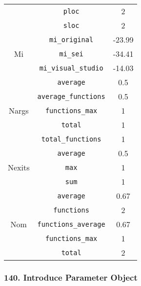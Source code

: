 \begin{center}
\begin{tabular}{ |c|c|c| }
          & \verb|ploc|                           & 2          \\
          & \verb|sloc|                           & 2          \\
    \hline
    \multirow{ 3 }{6em}{ Mi }
          & \verb|mi_original|                    & -23.99     \\
          & \verb|mi_sei|                         & -34.41     \\
          & \verb|mi_visual_studio|               & -14.03     \\
    \hline
    \multirow{ 5 }{6em}{ Nargs }
          & \verb|average|                        & 0.5        \\
          & \verb|average_functions|              & 0.5        \\
          & \verb|functions_max|                  & 1          \\
          & \verb|total|                          & 1          \\
          & \verb|total_functions|                & 1          \\
    \hline
    \multirow{ 3 }{6em}{ Nexits }
          & \verb|average|                        & 0.5        \\
          & \verb|max|                            & 1          \\
          & \verb|sum|                            & 1          \\
    \hline
    \multirow{ 5 }{6em}{ Nom }
          & \verb|average|                        & 0.67       \\
          & \verb|functions|                      & 2          \\
          & \verb|functions_average|              & 0.67       \\
          & \verb|functions_max|                  & 1          \\
          & \verb|total|                          & 2          \\
    \hline
  \end{tabular}
\end{center}
\subsubsection{ 140. Introduce Parameter Object }

